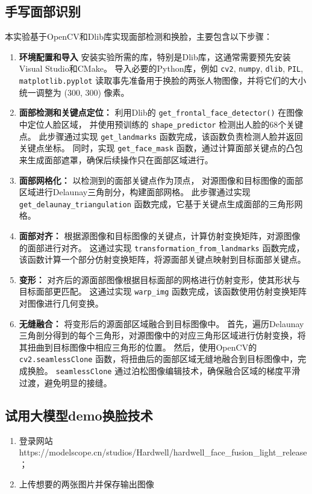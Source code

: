 \subsection{手写面部识别}
本实验基于OpenCV和Dlib库实现面部检测和换脸，主要包含以下步骤：

\begin{enumerate}
    \item \textbf{环境配置和导入} 
	安装实验所需的库，特别是Dlib库，这通常需要预先安装Visual Studio和CMake。
	导入必要的Python库，例如 \texttt{cv2}, \texttt{numpy}, \texttt{dlib}, \texttt{PIL}, \texttt{matplotlib.pyplot} 
	读取事先准备用于换脸的两张人物图像，并将它们的大小统一调整为 (300, 300) 像素。

    \item \textbf{面部检测和关键点定位：} 
	利用Dlib的 \texttt{get_frontal_face_detector()} 在图像中定位人脸区域，
	并使用预训练的 \texttt{shape_predictor} 检测出人脸的68个关键点。
	此步骤通过实现 \texttt{get_landmarks} 函数完成，该函数负责检测人脸并返回关键点坐标。
	同时，实现 \texttt{get_face_mask} 函数，通过计算面部关键点的凸包来生成面部遮罩，确保后续操作只在面部区域进行。

    \item \textbf{面部网格化：} 
	以检测到的面部关键点作为顶点，
	对源图像和目标图像的面部区域进行Delaunay三角剖分，构建面部网格。
	此步骤通过实现 \texttt{get_delaunay_triangulation} 函数完成，它基于关键点生成面部的三角形网格。

    \item \textbf{面部对齐：} 
	根据源图像和目标图像的关键点，计算仿射变换矩阵，对源图像的面部进行对齐。
	这通过实现 \texttt{transformation_from_landmarks} 函数完成，
	该函数计算一个部分仿射变换矩阵，将源面部关键点映射到目标面部关键点。

    \item \textbf{变形：} 
	对齐后的源面部图像根据目标面部的网格进行仿射变形，使其形状与目标面部更匹配。
	这通过实现 \texttt{warp_img} 函数完成，该函数使用仿射变换矩阵对图像进行几何变换。
    
	\item \textbf{无缝融合：} 
	将变形后的源面部区域融合到目标图像中。
	首先，遍历Delaunay三角剖分得到的每个三角形，对源图像中的对应三角形区域进行仿射变换，将其扭曲到目标图像中相应三角形的位置。
	然后，使用OpenCV的 \texttt{cv2.seamlessClone} 函数，将扭曲后的面部区域无缝地融合到目标图像中，完成换脸。
	\texttt{seamlessClone} 通过泊松图像编辑技术，确保融合区域的梯度平滑过渡，避免明显的接缝。
\end{enumerate}

\subsection{试用大模型demo换脸技术}
\begin{enumerate}
	\item 登录网站https://modelscope.cn/studios/Hardwell/hardwell_face_fusion_light_release；
	\item 上传想要的两张图片并保存输出图像
\end{enumerate}
